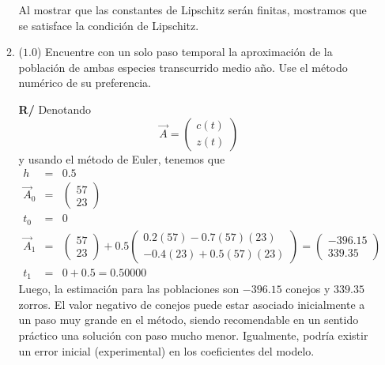 \documentclass[12pt]{article}
\begin{document}
\begin{enumerate}[leftmargin=*,widest=9]
\begin{enumerate}[label=\alph*]
    Al mostrar que las constantes de Lipschitz serán finitas, mostramos que se satisface la condición de Lipschitz.

    \item (\(1.0\)) Encuentre con un solo paso temporal la aproximación de la población de ambas especies transcurrido medio año. Use el método numérico de su preferencia.

    \textbf{R/}
Denotando
\[
\vec{A} = \begin{pmatrix}c(t)\\z(t)\end{pmatrix}
\]
y usando el método de Euler, tenemos que
\begin{eqnarray*}
h &=& 0.5\\
\vec{A}_0 &=& \begin{pmatrix}57\\23\end{pmatrix}\\
t_0 &=& 0\\
\vec{A}_1 &=& \begin{pmatrix}57\\23\end{pmatrix} + 0.5\begin{pmatrix}0.2(57) - 0.7(57)(23)\\ -0.4(23)+0.5(57)(23)\end{pmatrix}=\begin{pmatrix}-396.15\\339.35\end{pmatrix}\\
t_1 &=& 0 + 0.5 = 0.50000
\end{eqnarray*}
Luego, la estimación para las poblaciones son \(-396.15\) conejos y \(339.35\) zorros. El valor negativo de conejos puede estar asociado inicialmente a un paso muy grande en el método, siendo recomendable en un sentido práctico una solución con paso mucho menor. Igualmente, podría existir un error inicial (experimental) en los coeficientes del modelo.
    \end{enumerate}

\end{enumerate}
\end{document}
